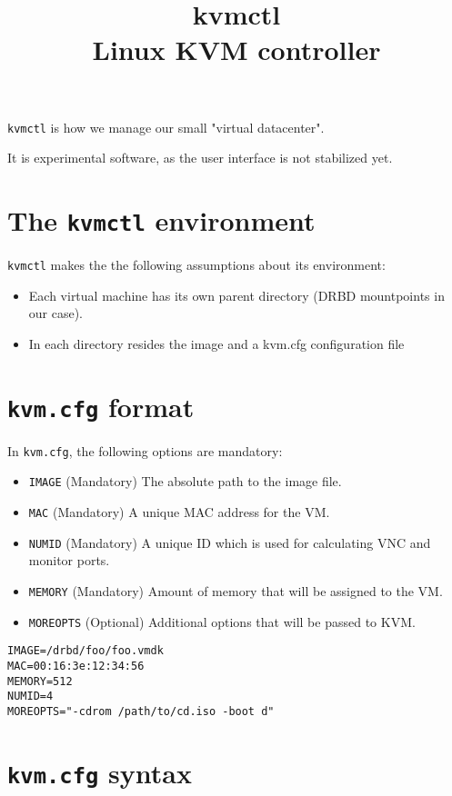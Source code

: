 \documentclass[11pt]{article}
\title{kvmctl \\ Linux KVM controller}
\begin{document}
\maketitle

\texttt{kvmctl} is how we manage our small "virtual datacenter". 

It is experimental software, as the user interface is not stabilized yet.

\section{The \texttt{kvmctl} environment}

\texttt{kvmctl} makes the the following assumptions about its environment:

\begin{itemize}
\item Each virtual machine has its own parent directory (DRBD mountpoints in our case).
\item In each directory resides the image and a kvm.cfg configuration file
\end{itemize}

\section{\texttt{kvm.cfg} format}

In \texttt{kvm.cfg}, the following options are mandatory:

\begin{itemize}
\item \texttt{IMAGE} (Mandatory) The absolute path to the image file.
\item \texttt{MAC} (Mandatory) A unique MAC address for the VM.
\item \texttt{NUMID} (Mandatory) A unique ID which is used for calculating VNC and monitor ports.
\item \texttt{MEMORY} (Mandatory) Amount of memory that will be assigned to the VM.
\item \texttt{MOREOPTS} (Optional) Additional options that will be passed to KVM.
\end{itemize}

\begin{lstlisting}[caption=kvm.cfg example]
IMAGE=/drbd/foo/foo.vmdk
MAC=00:16:3e:12:34:56
MEMORY=512
NUMID=4
MOREOPTS="-cdrom /path/to/cd.iso -boot d"
\end{lstlisting}

\section{\texttt{kvm.cfg} syntax}
\end{document}
